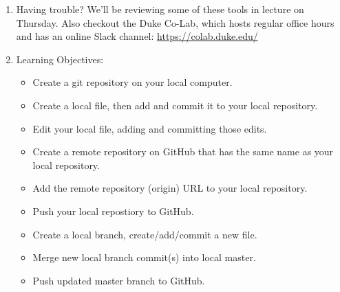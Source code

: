 \begin{enumerate}
\item Having trouble?  We'll be reviewing some of these tools in lecture on Thursday.  Also checkout the Duke Co-Lab, which hosts regular office hours and has an online Slack channel: \url{https://colab.duke.edu/}

\item Learning Objectives:
\begin{itemize}
	\item Create a git repository on your local computer. 
	\item Create a local file, then add and commit it to your local repository.
	\item Edit your local file, adding and committing those edits.
	\item Create a remote repository on GitHub that has the same name as your local repository.
	\item Add the remote repository (origin) URL to your local repository.
	\item Push your local repostiory to GitHub.
	\item Create a local branch, create/add/commit a new file.
	\item Merge new local branch commit(s) into local master.
	\item Push updated master branch to GitHub.
\end{itemize}

\end{enumerate}


